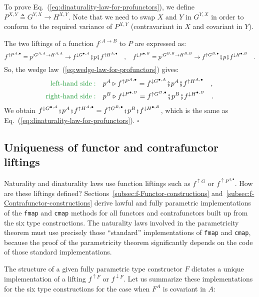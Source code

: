 To prove Eq.~(\ref{eq:dinaturality-law-for-profunctors}), we define
$P^{X,Y}\triangleq G^{Y,X}\rightarrow H^{X,Y}$. Note that we need
to swap $X$ and $Y$ in $G^{Y,X}$ in order to conform to the required
variance of $P^{X,Y}$ (contravariant in $X$ and covariant in $Y$). 

The two liftings of a function $f^{:A\rightarrow B}$ to $P$ are
expressed as:
\[
f^{\uparrow P^{A,\bullet}}=p^{:G^{A,A}\rightarrow H^{A,A}}\rightarrow f^{\downarrow G^{\bullet,A}}\bef p\bef f^{\uparrow H^{A,\bullet}}\quad,\quad f^{\downarrow P^{\bullet,B}}=p^{:G^{B,B}\rightarrow H^{B,B}}\rightarrow f^{\uparrow G^{B,\bullet}}\bef p\bef f^{\downarrow H^{\bullet,B}}\quad.
\]
So, the wedge law~(\ref{eq:wedge-law-for-profunctors}) gives:
\begin{align*}
{\color{greenunder}\text{left-hand side}:}\quad & p^{A}\triangleright f^{\uparrow P^{A,\bullet}}=f^{\downarrow G^{\bullet,A}}\bef p^{A}\bef f^{\uparrow H^{A,\bullet}}\quad,\\
{\color{greenunder}\text{right-hand side}:}\quad & p^{B}\triangleright f^{\downarrow P^{\bullet,B}}=f^{\uparrow G^{B,\bullet}}\bef p^{B}\bef f^{\downarrow H^{\bullet,B}}\quad.
\end{align*}
We obtain $f^{\downarrow G^{\bullet,A}}\bef p^{A}\bef f^{\uparrow H^{A,\bullet}}=f^{\uparrow G^{B,\bullet}}\bef p^{B}\bef f^{\downarrow H^{\bullet,B}}$,
which is the same as Eq.~(\ref{eq:dinaturality-law-for-profunctors}).
$\square$

\subsection{Uniqueness of functor and contrafunctor liftings\label{sec:Uniqueness-of-functor-and-contrafunctor}}

Naturality and dinaturality laws use function liftings such as $f^{\uparrow G}$
or $f^{\uparrow P^{A,\bullet}}$. How are these liftings defined?
Sections~\ref{subsec:f-Functor-constructions} and~\ref{subsec:f-Contrafunctor-constructions}
derive lawful and fully parametric implementations of the \lstinline!fmap!
and \lstinline!cmap! methods for all functors and contrafunctors
built up from the six type constructions. The naturality laws involved
in the parametricity theorem must use precisely those \textsf{``}standard\textsf{''}
implementations of \lstinline!fmap! and \lstinline!cmap!, because
the proof of the parametricity theorem significantly depends on the
code of those standard implementations.

The structure of a given fully parametric type constructor $F$ dictates
a unique implementation of a lifting $f^{\uparrow F}$ or $f^{\downarrow F}$.
Let us summarize these implementations for the six type constructions
for the case when $F^{A}$ is covariant in $A$:

